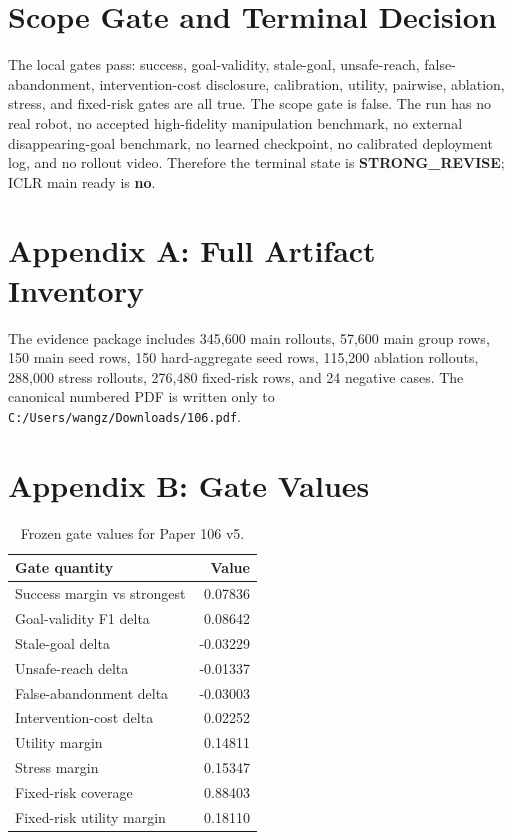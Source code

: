 \documentclass{article}
\begin{document}
\section{Scope Gate and Terminal Decision}
The local gates pass: success, goal-validity, stale-goal, unsafe-reach, false-abandonment, intervention-cost disclosure, calibration, utility, pairwise, ablation, stress, and fixed-risk gates are all true. The scope gate is false. The run has no real robot, no accepted high-fidelity manipulation benchmark, no external disappearing-goal benchmark, no learned checkpoint, no calibrated deployment log, and no rollout video. Therefore the terminal state is \textbf{STRONG\_REVISE}; ICLR main ready is \textbf{no}.

\clearpage
\appendix

\section{Appendix A: Full Artifact Inventory}
The evidence package includes 345,600 main rollouts, 57,600 main group rows, 150 main seed rows, 150 hard-aggregate seed rows, 115,200 ablation rollouts, 288,000 stress rollouts, 276,480 fixed-risk rows, and 24 negative cases. The canonical numbered PDF is written only to \texttt{C:/Users/wangz/Downloads/106.pdf}.

\section{Appendix B: Gate Values}
\begin{table}[h]
\centering
\small
\caption{Frozen gate values for Paper 106 v5.}
\begin{tabular}{lr}
\toprule
Gate quantity & Value \\
\midrule
Success margin vs strongest & 0.07836 \\
Goal-validity F1 delta & 0.08642 \\
Stale-goal delta & -0.03229 \\
Unsafe-reach delta & -0.01337 \\
False-abandonment delta & -0.03003 \\
Intervention-cost delta & 0.02252 \\
Utility margin & 0.14811 \\
Stress margin & 0.15347 \\
Fixed-risk coverage & 0.88403 \\
Fixed-risk utility margin & 0.18110 \\
\bottomrule
\end{tabular}
\end{table}
\end{document}

